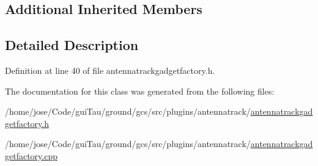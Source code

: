 \subsection*{Additional Inherited Members}


\subsection{Detailed Description}


Definition at line 40 of file antennatrackgadgetfactory.\-h.



The documentation for this class was generated from the following files\-:\begin{DoxyCompactItemize}
\item 
/home/jose/\-Code/gui\-Tau/ground/gcs/src/plugins/antennatrack/\hyperlink{antennatrackgadgetfactory_8h}{antennatrackgadgetfactory.\-h}\item 
/home/jose/\-Code/gui\-Tau/ground/gcs/src/plugins/antennatrack/\hyperlink{antennatrackgadgetfactory_8cpp}{antennatrackgadgetfactory.\-cpp}\end{DoxyCompactItemize}

